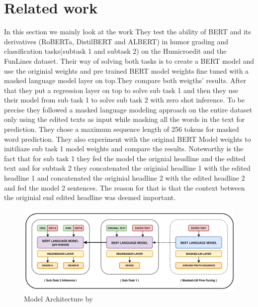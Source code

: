 \documentclass[11pt,a4paper,onecolumn,oneside,notitlepage]{article}
\begin{document}
	\section{Related work}
		In this section we mainly look at the work \textcite{Bert1}
		They test the ability of BERT and its derivatives (RoBERTa, DistilBERT and ALBERT) in humor grading and classification tasks(subtask 1 and subtask 2) on the Humicroedit and the FunLines dataset.
		Their way of solving both tasks is to create a  BERT model and use the originial weights and  pre trained BERT model weights  fine tuned  with a masked language model layer on top.They compare both weigths' results. After that they put a regression layer on top to solve sub task 1 and then they use their model from sub task 1 to solve sub task 2 with zero shot inference. 
		To be precise they followed a masked language modeling approach on the entire dataset only using the edited texts as input while masking all the words in the text for prediction. They chose a maximum sequence length of 256 tokens for masked word prediction. They also experiment with the original BERT Model weights to initiliaze sub task 1 model weights and compare the results.
		Noteworthy is the fact that for sub  task 1 they fed the model the orignial headline and the edited text and for subtask 2 they concatenated the originial headline 1 with the edited headline 1 and concatenated the originial headline 2 with the edited headline 2 and fed the model 2 sentences.
		The reason for that is that the context between the originial end edited headline was deemed important.
		  \begin{figure}
			\begin{center}
				\includegraphics[width=1.0\linewidth]{system_architecture.png}
			\end{center}
			
			\caption{Model Architecture by \textcite{Bert1} }\label{fig1}
		\end{figure}	
\end{document}

